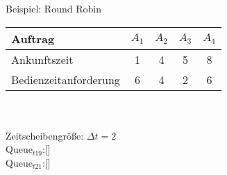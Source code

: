 \begin{frame}{Beispiel: Round Robin}
	\begin{tabular}{l||c|c|c|c}
		Auftrag               & \(A_1\)  & \(A_2\)  & \(A_3\) & \(A_4\) \\ \hline \hline
		Ankunftszeit		  & 1        &  4		& 5       & 8       \\ \hline
		Bedienzeitanforderung & 6        &  4       & 2       & 6       \\
	\end{tabular}\quad \\ \quad \\
	Zeitscheibengröße: \(\Delta t = 2\) \\
	Queue\(_{t19}\):[\(\)] \\
	Queue\(_{t21}\):[\(\)] \\
	\begin{center}
	\begin{blockgraph}{25}{1}{0.4}
    
    \end{blockgraph}
	\end{center}
\end{frame}